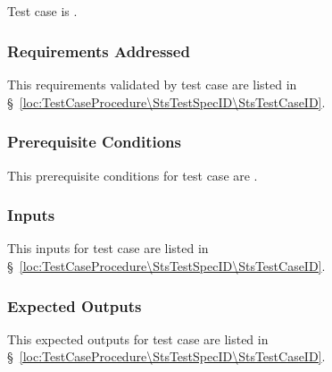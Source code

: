 
\subsection{\StsTestCaseID}
\label{loc:Test\StsTestCaseID}


Test \StsTestSpecID{} case \StsTestCaseID{} is \TBD.

\subsubsection{Requirements Addressed}
\label{loc:TestCaseRequirementsAddressed\StsTestSpecID\StsTestCaseID}


This requirements validated by test \StsTestSpecID{} case \StsTestCaseID{} are listed in \S~\ref{loc:TestCaseProcedure\StsTestSpecID\StsTestCaseID}.

\subsubsection{Prerequisite Conditions}
\label{loc:TestCasePrerequisiteConditions\StsTestSpecID\StsTestCaseID}


This prerequisite conditions for test \StsTestSpecID{} case \StsTestCaseID{} are \TBD.

\subsubsection{Inputs}
\label{loc:TestCaseInputs\StsTestSpecID\StsTestCaseID}


This inputs for test \StsTestSpecID{} case \StsTestCaseID{} are listed in \S~\ref{loc:TestCaseProcedure\StsTestSpecID\StsTestCaseID}.

\subsubsection{Expected Outputs}
\label{loc:TestCaseExpectedOutputs\StsTestSpecID\StsTestCaseID}


This expected outputs for test \StsTestSpecID{} case \StsTestCaseID{} are listed in \S~\ref{loc:TestCaseProcedure\StsTestSpecID\StsTestCaseID}.

